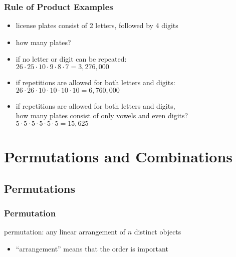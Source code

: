\documentclass[dvipsnames]{beamer}
\begin{document}
\begin{frame}
  \frametitle{Rule of Product Examples}

  \begin{example}
    \begin{itemize}
      \item license plates consist of 2 letters, followed by 4 digits
      \item how many plates?

      \pause
      \medskip
      \item if no letter or digit can be repeated:\\
        $26 \cdot 25 \cdot 10 \cdot 9 \cdot 8 \cdot 7 = 3,276,000$

      \pause
      \medskip
      \item if repetitions are allowed for both letters and digits:\\
        $26 \cdot 26 \cdot 10 \cdot 10 \cdot 10 \cdot 10 = 6,760,000$

      \pause
      \medskip
      \item if repetitions are allowed for both letters and digits,\\
        how many plates consist of only vowels and even digits?\\
        $5 \cdot 5 \cdot 5 \cdot 5 \cdot 5 \cdot 5 = 15,625$
   \end{itemize}
  \end{example}
\end{frame}

\section{Permutations and Combinations}

\subsection{Permutations}

\begin{frame}
  \frametitle{Permutation}

  \begin{definition}
    \alert{permutation}: any linear arrangement of $n$ distinct objects
  \end{definition}

  \begin{itemize}
    \item ``arrangement'' means that the order is important
  \end{itemize}
\end{frame}
\end{document}
